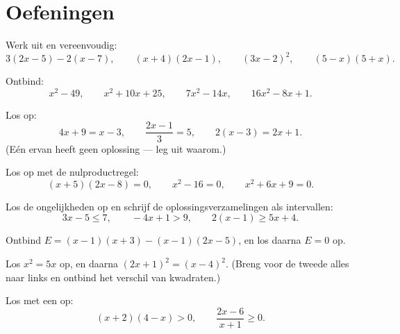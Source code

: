 \section{Oefeningen}

\begin{exercise}[$\star$]\label{exo:g10:algebra:1}
Werk uit en vereenvoudig:
\[
3(2x - 5) - 2(x - 7), \qquad
(x + 4)(2x - 1), \qquad
(3x - 2)^2, \qquad
(5 - x)(5 + x).
\]
\end{exercise}

\begin{exercise}[$\star$]\label{exo:g10:algebra:2}
Ontbind:
\[
x^2 - 49, \qquad
x^2 + 10x + 25, \qquad
7x^2 - 14x, \qquad
16x^2 - 8x + 1 .
\]
\end{exercise}

\begin{exercise}[$\star$]\label{exo:g10:algebra:3}
Los op:
\[
4x + 9 = x - 3, \qquad
\frac{2x - 1}{3} = 5, \qquad
2(x - 3) = 2x + 1 .
\]
(Eén ervan heeft geen oplossing --- leg uit waarom.)
\end{exercise}

\begin{exercise}[$\star$]\label{exo:g10:algebra:4}
Los op met de nulproductregel:
\[
(x + 5)(2x - 8) = 0, \qquad
x^2 - 16 = 0, \qquad
x^2 + 6x + 9 = 0 .
\]
\end{exercise}

\begin{exercise}[$\star$]\label{exo:g10:algebra:5}
Los de ongelijkheden op en schrijf de oplossingsverzamelingen als
intervallen:
\[
3x - 5 \leq 7, \qquad
-4x + 1 > 9, \qquad
2(x - 1) \geq 5x + 4 .
\]
\end{exercise}

\begin{exercise}[$\star\star$]\label{exo:g10:algebra:6}
Ontbind $E = (x - 1)(x + 3) - (x - 1)(2x - 5)$, en los daarna $E = 0$ op.
\end{exercise}

\begin{exercise}[$\star\star$]\label{exo:g10:algebra:7}
Los $x^2 = 5x$ op, en daarna $(2x + 1)^2 = (x - 4)^2$. (Breng voor de tweede
alles naar links en ontbind het verschil van kwadraten.)
\end{exercise}

\begin{exercise}[$\star\star$]\label{exo:g10:algebra:8}
Los met een  op:
\[
(x + 2)(4 - x) > 0,
\qquad
\frac{2x - 6}{x + 1} \geq 0 .
\]
\end{exercise}


